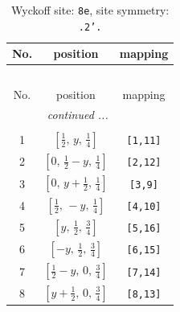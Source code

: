 \documentclass[fleqn,8pt]{jsarticle}
\begin{document}
\renewcommand{\arraystretch}{1.2}
\begin{longtable}{ccc}
\caption{Wyckoff site: {\tt 8e}, site symmetry: {\tt .2'.}}
 \\
 \hline \hline
No. & position & mapping \\ \hline \endfirsthead

\multicolumn{2}{l}{\tablename\ \thetable{}} \\
 \hline \hline
No. & position & mapping \\ \hline \endhead

 \hline \hline
\multicolumn{2}{r}{\footnotesize\it continued ...} \\ \endfoot

 \hline \hline
\multicolumn{2}{r}{} \\ \endlastfoot

1 & $\left[ \frac{1}{2},\, y,\, \frac{1}{4} \right]$ & {\tt [1,11]} \\ \hline
2 & $\left[ 0,\, \frac{1}{2} - y,\, \frac{1}{4} \right]$ & {\tt [2,12]} \\ \hline
3 & $\left[ 0,\, y + \frac{1}{2},\, \frac{1}{4} \right]$ & {\tt [3,9]} \\ \hline
4 & $\left[ \frac{1}{2},\, - y,\, \frac{1}{4} \right]$ & {\tt [4,10]} \\ \hline
5 & $\left[ y,\, \frac{1}{2},\, \frac{3}{4} \right]$ & {\tt [5,16]} \\ \hline
6 & $\left[ - y,\, \frac{1}{2},\, \frac{3}{4} \right]$ & {\tt [6,15]} \\ \hline
7 & $\left[ \frac{1}{2} - y,\, 0,\, \frac{3}{4} \right]$ & {\tt [7,14]} \\ \hline
8 & $\left[ y + \frac{1}{2},\, 0,\, \frac{3}{4} \right]$ & {\tt [8,13]} \\
\end{longtable}
\renewcommand{\arraystretch}{1.2}
\end{document}
